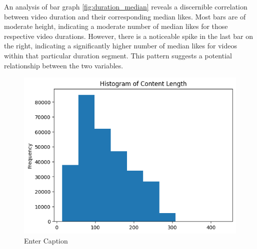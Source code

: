 \documentclass[11pt,a4paper]{article}
\begin{document}
An analysis of bar graph \ref{fig:duration_median} reveals a discernible correlation between video duration and their corresponding median likes. Most bars are of moderate height, indicating a moderate number of median likes for those respective video durations. However, there is a noticeable spike in the last bar on the right, indicating a significantly higher number of median likes for videos within that particular duration segment. This pattern suggests a potential relationship between the two variables.

\begin{figure}
    \centering
    \includegraphics[width=0.5\linewidth]{content_len_histogram.png}
    \caption{Enter Caption}
    \label{fig:enter-label}
\end{figure}
\end{document}
